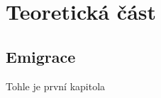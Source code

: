 \part{Teoretická část}

\hypertarget{emigrace}{%
\chapter{Emigrace}\label{emigrace}}

Tohle je první kapitola~\parencite{Krajane-mv}
